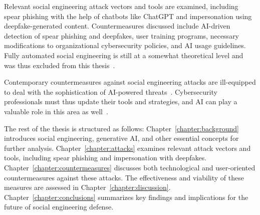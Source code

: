 %
%
Relevant social engineering attack vectors and tools are examined, including spear phishing with the help of chatbots like ChatGPT and impersonation using deepfake-generated content. Countermeasures discussed include AI-driven detection of spear phishing and deepfakes, user training programs, necessary modifications to organizational cybersecurity policies, and AI usage guidelines. Fully automated social engineering is still at a somewhat theoretical level and was thus excluded from this thesis~\citep{hatfield_SE_Evolution_Concept_2018}.



%
%
Contemporary countermeasures against social engineering attacks are ill-equipped to deal with the sophistication of AI-powered threats~\citep{blauth_AI_Crime_Overview_Malicious_Use_Abuse_2022, king_AI_Crime_Interdisciplinary_Analysis_2019}. Cybersecurity professionals must thus update their tools and strategies, and AI can play a valuable role in this area as well~\citep{fakhouri_AI_Driven_Solutions_SE_Attacks_2024, tsinganos_Towards_Automated_Recognition_Chat_SE_Enterprise_2018}.





%
%
The rest of the thesis is structured as follows: Chapter~\ref{chapter:background} introduces social engineering, generative AI, and other essential concepts for further analysis. Chapter~\ref{chapter:attacks} examines relevant attack vectors and tools, including spear phishing and impersonation with deepfakes. Chapter~\ref{chapter:countermeasures} discusses both technological and user-oriented countermeasures against these attacks. The effectiveness and viability of these measures are assessed in Chapter~\ref{chapter:discussion}. Chapter~\ref{chapter:conclusions} summarizes key findings and implications for the future of social engineering defense.
